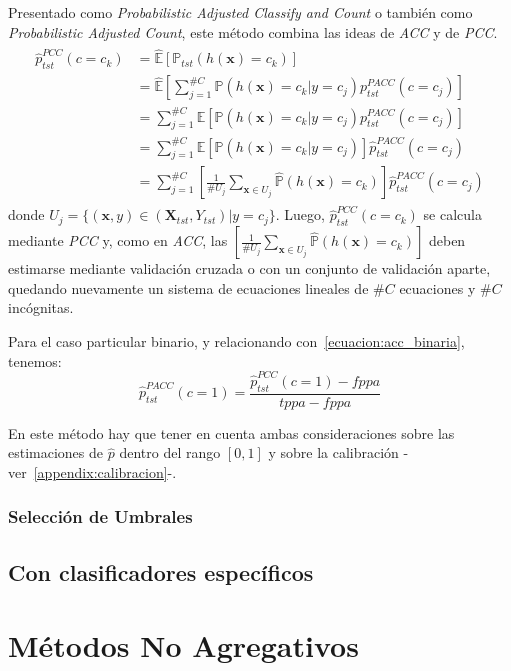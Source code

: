 Presentado como {\it Probabilistic Adjusted Classify and Count\/} o también como
{\it Probabilistic Adjusted Count}, este método combina las ideas de {\it ACC\/}
y de {\it PCC}.
\begin{align}
\begin{split}
    \hat p^{PCC}_{tst}(c=c_k) &= \mathbb{\hat E}[\mathbb{P}_{tst}(h(\boldsymbol{x})=c_k)] \\
    &= \mathbb{\hat E}[\sum \limits_{j=1}^{\#C}{\mathbb{P}(h(\boldsymbol{x})=c_k|y=c_j) p^{PACC}_{tst}(c=c_j)}] \\
    &= \sum \limits_{j=1}^{\#C}\mathbb{\hat E}[{\mathbb{P}(h(\boldsymbol{x})=c_k|y=c_j) p^{PACC}_{tst}(c=c_j)}] \\
    &= \sum \limits_{j=1}^{\#C}\mathbb{\hat E}[{\mathbb{P}(h(\boldsymbol{x})=c_k|y=c_j)}] \hat p^{PACC}_{tst}(c=c_j) \\
    &= \sum \limits_{j=1}^{\#C} [\frac {1}{\#U_j} \sum_{\boldsymbol{x} \in U_j} \mathbb{\hat P}(h(\boldsymbol{x})=c_k)] \hat p^{PACC}_{tst}(c=c_j)
\end{split}
\end{align}
donde $U_j=\{(\boldsymbol{x}, y) \in (\boldsymbol{X}_{tst}, Y_{tst}) | y=c_j\}$.
Luego, $\hat p^{PCC}_{tst}(c=c_k)$ se calcula mediante {\it PCC\/} y, como en
{\it ACC}, las $[\frac {1}{\#U_j} \sum_{\boldsymbol{x} \in U_j} \mathbb{\hat
P}(h(\boldsymbol{x})=c_k)]$ deben estimarse mediante validación cruzada o con un
conjunto de validación aparte, quedando nuevamente un sistema de ecuaciones
lineales de $\#C$ ecuaciones y $\#C$ incógnitas.

Para el caso particular binario, y relacionando con~\ref{ecuacion:acc_binaria},
tenemos:
\begin{equation}
    \hat p^{PACC}_{tst}(c=1) = \frac{\hat p^{PCC}_{tst}(c=1)-fppa}{tppa-fppa}
\end{equation}

En este método hay que tener en cuenta ambas consideraciones sobre las
estimaciones de $\hat p$ dentro del rango $[0, 1]$ y sobre la calibración
-ver~\ref{appendix:calibracion}-.

\subsubsection{Selección de Umbrales}



\subsection{Con clasificadores específicos}

\section{Métodos No Agregativos}\label{puntual:no_agregativos}
